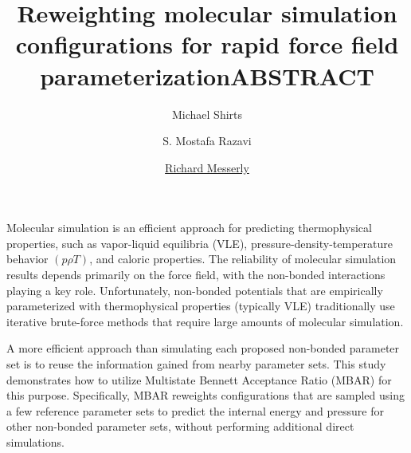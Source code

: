 \documentclass[11pt,a4paper]{article}
\begin{document}
	\thispagestyle{empty}
	\title{\Large \textbf{Reweighting molecular simulation configurations for rapid force field parameterization}}
	\author[2]{\large {Michael Shirts}}
	\author[3]{\large {S. Mostafa Razavi}}
	\author[1]{\large {\underline{Richard Messerly}}}%
	
	
	
	\date{} %
	\maketitle\thispagestyle{empty} %
	\begin{center}
		\title{\textbf{ABSTRACT}}\centering{}
	\end{center}
	\justify
	
	
	
	Molecular simulation is an efficient approach for predicting thermophysical properties, such as vapor-liquid equilibria (VLE), pressure-density-temperature behavior $(p\rho T)$, and caloric properties. The reliability of molecular simulation results depends primarily on the force field, with the non-bonded interactions playing a key role. Unfortunately, non-bonded potentials that are empirically parameterized with thermophysical properties (typically VLE) traditionally use iterative brute-force methods that require large amounts of molecular simulation. 
	
	A more efficient approach than simulating each proposed non-bonded parameter set is to reuse the information gained from nearby parameter sets. This study demonstrates how to utilize Multistate Bennett Acceptance Ratio (MBAR) for this purpose. Specifically, MBAR reweights configurations that are sampled using a few reference parameter sets to predict the internal energy and pressure for other non-bonded parameter sets, without performing additional direct simulations. 
	
\end{document}
